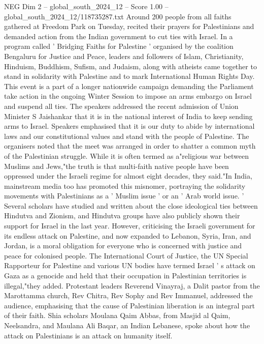 \begin{textsample}{NEG Dim 2 – global\_south\_2024\_12 – Score 1.00 – global\_south\_2024\_12/118735287.txt}  \label{ex:f2_neg_386}
Around 200 people from all faiths gathered at Freedom Park on Tuesday, recited their prayers for Palestinians and demanded action from the Indian government to cut ties with Israel.
In a program called ' Bridging Faiths for Palestine ' organised by the coalition Bengaluru for Justice and Peace, leaders and followers of Islam, Christianity, Hinduism, Buddhism, Sufism, and Judaism, along with atheists came together to stand in solidarity with Palestine and to mark International Human Rights Day.
This event is a part of a longer nationwide campaign demanding the Parliament take action in the ongoing Winter Session to impose an arms embargo on Israel and suspend all ties.
The speakers addressed the recent admission of Union Minister S Jaishankar that it is in the national interest of India to keep sending arms to Israel.
Speakers emphasised that it is our duty to abide by international laws and our constitutional values and stand with the people of Palestine.
The organisers noted that the meet was arranged in order to shatter a common myth of the Palestinian struggle.
While it is often termed as a"religious war between Muslims and Jews,"the truth is that multi-faith native people have been oppressed under the Israeli regime for almost eight decades, they said."In India, mainstream media too has promoted this misnomer, portraying the solidarity movements with Palestinians as a ' Muslim issue ' or an ' Arab world issue. ' Several scholars have studied and written about the close ideological ties between Hindutva and Zionism, and Hindutva groups have also publicly shown their support for Israel in the last year.
However, criticising the Israeli government for its endless attack on Palestine, and now expanded to Lebanon, Syria, Iran, and Jordan, is a moral obligation for everyone who is concerned with justice and peace for colonised people.
The International Court of Justice, the UN Special Rapporteur for Palestine and various UN bodies have termed Israel ' s attack on Gaza as a genocide and held that their occupation in Palestinian territories is illegal,"they added.
Protestant leaders Reverend Vinayraj, a Dalit pastor from the Marottamma church, Rev Chitra, Rev Sophy and Rev Immanuel, addressed the audience, emphasising that the cause of Palestinian liberation is an integral part of their faith.
Shia scholars Moulana Qaim Abbas, from Masjid al Qaim, Neelsandra, and Maulana Ali Baqar, an Indian Lebanese, spoke about how the attack on Palestinians is an attack on humanity itself.

\end{textsample}
